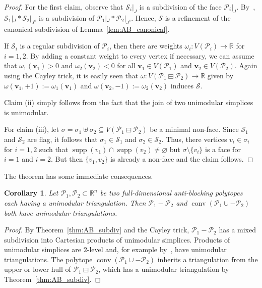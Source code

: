 \documentclass[11pt]{amsart}
\newtheorem{cor}[thm]{Corollary}
\theoremstyle{definition}
\begin{document}
\begin{proof}
    For the first claim, observe that ${\mathcal{S}}_i|_J$ is a subdivision of the
    face ${\mathcal{P}}_i|_J$. By~\cite[Thm~4.2.7]{DLRS}, ${\mathcal{S}}_1|_J *
    {\mathcal{S}}_2|_{J^c}$ is a subdivision of ${\mathcal{P}}_1|_J * {\mathcal{P}}_2|_{J^c}$. Hence,
    ${\mathcal{S}}$ is a refinement of the canonical subdivision of
    Lemma~\ref{lem:AB_canonical}.

    If ${\mathcal{S}}_i$ is a regular subdivision of ${\mathcal{P}}_i$, then there are weights
    $\omega_i : V({\mathcal{P}}_i) \rightarrow {\mathbb{R}}$ for $i=1,2$. By adding a constant
    weight to every vertex if necessary, we can assume that $\omega_1({\mathbf{v}}_1) >
    0$ and $\omega_2({\mathbf{v}}_2) < 0$ for all ${\mathbf{v}}_1 \in V({\mathcal{P}}_1)$ and ${\mathbf{v}}_2 \in
    V({\mathcal{P}}_2)$. Again using the Cayley trick, it is easily seen that $\omega :
    V({{{{\mathcal{P}}_1} \boxminus {{\mathcal{P}}_2}}}) \rightarrow {\mathbb{R}}$ given by $\omega({\mathbf{v}}_1,+1) :=
    \omega_1({\mathbf{v}}_1)$ and $\omega({\mathbf{v}}_2,-1) := \omega_2({\mathbf{v}}_2)$ induces ${\mathcal{S}}$.
    
    Claim (ii) simply follows from the fact that the join of two unimodular
    simplices is unimodular. 
    
    For claim (iii), let $\sigma = \sigma_1 \uplus \sigma_2 \subseteq
    V({{{{\mathcal{P}}_1} \boxminus {{\mathcal{P}}_2}}})$ be a minimal non-face. Since ${\mathcal{S}}_1$ and
    ${\mathcal{S}}_2$ are flag, it follows that $\sigma_1 \in {\mathcal{S}}_1$ and
    $\sigma_2 \in {\mathcal{S}}_2$. Thus, there vertices $v_i \in \sigma_i$ for
    $i=1,2$ such that $\operatorname{supp}(v_1) \cap \operatorname{supp}(v_2) \neq {\varnothing}$ but $\sigma
    \setminus \{v_i\}$ is a face for $i=1$ and $i=2$. But then $\{v_1,v_2\}$
    is already a non-face and the claim follows.
\end{proof}

The theorem has some immediate consequences.

\begin{cor}
    Let ${\mathcal{P}}_1, {\mathcal{P}}_2 \subset {\mathbb{R}}^n$ be two full-dimensional anti-blocking
    polytopes each having a unimodular triangulation. Then ${\mathcal{P}}_1 - {\mathcal{P}}_2$ and
    $\operatorname{conv}({\mathcal{P}}_1 \cup -{\mathcal{P}}_2)$ both have unimodular triangulations. 
            \end{cor}
\begin{proof}
    By Theorem~\ref{thm:AB_subdiv} and the Cayley trick, ${\mathcal{P}}_1 - {\mathcal{P}}_2$ has a
    mixed subdivision into Cartesian products of unimodular simplices.
    Products of unimodular simplices are $2$-level and, for example 
    by~\cite[Thm.~2.4]{Sullivant}, have unimodular triangulations. The
    polytope $\operatorname{conv}({\mathcal{P}}_1 \cup -{\mathcal{P}}_2)$ inherits a triangulation from the
    upper or lower hull of ${{{{\mathcal{P}}_1} \boxminus {{\mathcal{P}}_2}}}$, which has a unimodular
    triangulation by Theorem~\ref{thm:AB_subdiv}.
\end{proof}
\end{document}
